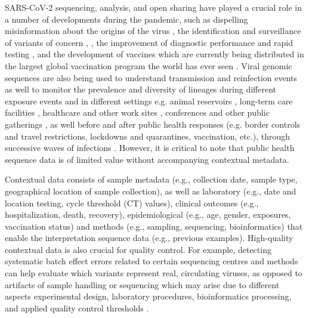 SARS-CoV-2 sequencing, analysis, and open sharing have played a crucial role in a number of developments during the pandemic, such as dispelling misinformation about the origins of the virus \cite{andersen_proximal_2020}, the identification and surveillance of variants of concern \cite{gupta_will_2021}, \cite{public_health_england_sars-cov-2_nodate}, the improvement of diagnostic performance and rapid testing \cite{los_alamos_national_laboratory_silico_nodate, kuchinski_mutations_2022, ganguli_rapid_2020}, and the development of vaccines which are currently being distributed in the largest global vaccination program the world has ever seen \cite{world_health_organization_covid-19_nodate}. Viral genomic sequences are also being used to understand transmission and reinfection events \cite{tillett_genomic_2021} as well to monitor the prevalence and diversity of lineages during different exposure events and in different settings e.g. animal reservoirs \cite{oude_munnink_transmission_2021}, long-term care facilities \cite{lai_covid-19_2020, aggarwal_role_2020, murti_investigation_2021}, healthcare and other work sites \cite{dyal_covid-19_2020, gunther_sarscov2_2020, taylor_serial_2020, loconsole_investigation_2021, frampton_genomic_2021}, conferences and other public gatherings \cite{da_silva_filipe_genomic_2021}, as well before and after public health responses (e.g. border controls and travel restrictions, lockdowns and quarantines, vaccination, etc.), through successive waves of infections \cite{oude_munnink_rapid_2020, du_plessis_establishment_2021, githinji_tracking_2020, meredith_rapid_2020, zhang_analysis_2020, long_molecular_2020, geoghegan_genomic_2020, seemann_tracking_2020, mclaughlin_early_2021, fauver_coast--coast_2020, knock_key_2021, lane_genomics-informed_2021}. However, it is critical to note that public health sequence data is of limited value without accompanying contextual metadata. 

Contextual data consists of sample metadata (e.g., collection date, sample type, geographical location of sample collection), as well as laboratory (e.g., date and location testing, cycle threshold (CT) values), clinical outcomes (e.g., hospitalization, death, recovery), epidemiological (e.g., age, gender, exposures, vaccination status) and methods (e.g., sampling, sequencing, bioinformatics) that enable the interpretation sequence data (e.g., previous examples). High-quality contextual data is also crucial for quality control. For example, detecting systematic batch effect errors related to certain sequencing centres and methods can help evaluate which variants represent real, circulating viruses, as opposed to artifacts of sample handling or sequencing which may arise due to different aspects experimental design, laboratory procedures, bioinformatics processing, and applied quality control thresholds \cite{de_maio_issues_2020, rayko_quality_2020, poon_recurrent_2005}. 

